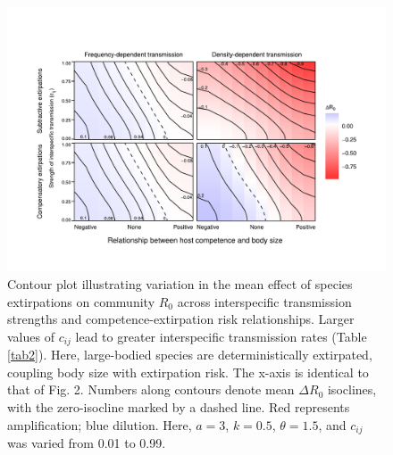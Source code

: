\begin{figure}
	\caption[Sensitivity to interspecific transmission intensity]{
	Contour plot illustrating variation in the mean effect of species extirpations on community $R_0$ across interspecific transmission strengths and competence-extirpation risk relationships. Larger values of $c_{ij}$ lead to greater interspecific transmission rates (Table \ref{tab2}). Here, large-bodied species are deterministically extirpated, coupling body size with extirpation risk. The x-axis is identical to that of Fig. 2. Numbers along contours denote mean $\Delta R_0$ isoclines, with the zero-isocline marked by a dashed line. Red represents amplification; blue dilution. Here, $a = 3$, $k = 0.5$, $\theta = 1.5$, and $c_{ij}$ was varied from 0.01 to 0.99.
	}
    \begin{center}
	\includegraphics[width=150mm]{figs/ch2/fig3.pdf}
    \end{center}
\label{2-3}
\end{figure}

